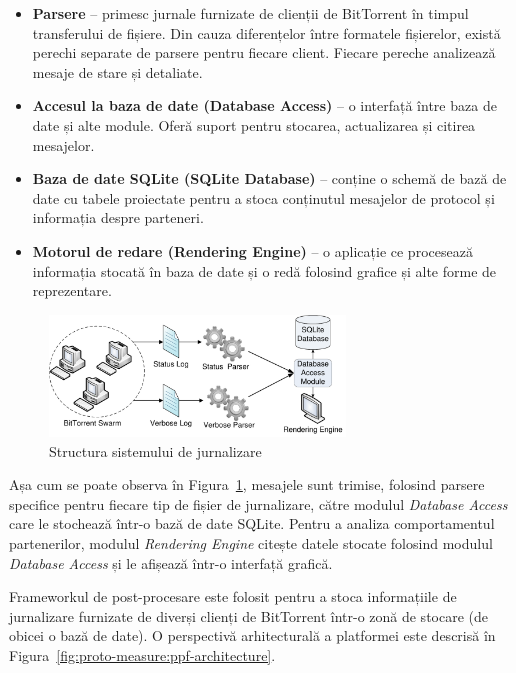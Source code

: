 \begin{itemize}
  \item \textbf{Parsere} -- primesc jurnale furnizate de clienții de BitTorrent
  în timpul transferului de fișiere. Din cauza diferențelor între formatele
  fișierelor, există perechi separate de parsere pentru fiecare client.
  Fiecare pereche analizează mesaje de stare și detaliate.
  \item \textbf{Accesul la baza de date (Database Access)} -- o interfață între baza de date
  și alte module. Oferă suport pentru stocarea, actualizarea și citirea
  mesajelor.
  \item \textbf{Baza de date SQLite (SQLite Database)} -- conține o schemă de bază de date cu
  tabele proiectate pentru a stoca conținutul mesajelor de protocol și
  informația despre parteneri.
  \item \textbf{Motorul de redare (Rendering Engine)} -- o aplicație ce procesează informația
  stocată în baza de date și o redă folosind grafice și alte forme de
  reprezentare.
\end{itemize}

\begin{figure}[h]
  \begin{center}
    \includegraphics[width=0.7\textwidth]{src/img/proto-measure/logarch-not-use}
  \end{center}
  \caption{Structura sistemului de jurnalizare}
  \label{fig:proto-measure:logarch}
\end{figure}

Așa cum se poate observa în Figura~\ref{fig:proto-measure:logarch},
mesajele sunt trimise, folosind parsere specifice pentru fiecare tip de fișier
de jurnalizare, către modulul \textit{Database Access} care le stochează
într-o bază de date SQLite. Pentru a analiza comportamentul partenerilor,
modulul \textit{Rendering Engine} citește datele stocate folosind modulul
\textit{Database Access} și le afișează într-o interfață grafică.

Frameworkul de post-procesare este folosit pentru a stoca informațiile de
jurnalizare furnizate de diverși clienți de BitTorrent într-o zonă de stocare
(de obicei o bază de date). O perspectivă arhitecturală a platformei este
descrisă în Figura~\ref{fig:proto-measure:ppf-architecture}.

